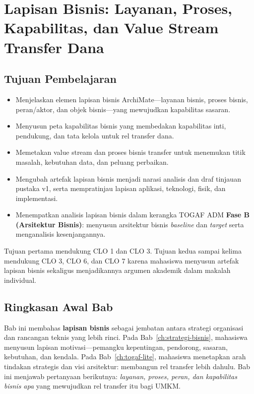 \chapter[Lapisan Bisnis: Layanan, Proses, dan Kapabilitas]{Lapisan Bisnis:
Layanan, Proses, Kapabilitas, dan Value Stream Transfer Dana}
\label{ch:business-architecture}
\setlength{\emergencystretch}{2em}

\section*{Tujuan Pembelajaran}
\begin{itemize}
  \item Menjelaskan elemen lapisan bisnis ArchiMate---layanan bisnis, proses
        bisnis, peran/aktor, dan objek bisnis---yang mewujudkan kapabilitas
        sasaran.
  \item Menyusun peta kapabilitas bisnis yang membedakan kapabilitas inti,
        pendukung, dan tata kelola untuk rel transfer dana.
  \item Memetakan value stream dan proses bisnis transfer untuk menemukan titik
        masalah, kebutuhan data, dan peluang perbaikan.
  \item Mengubah artefak lapisan bisnis menjadi narasi analisis dan draf
        tinjauan pustaka v1, serta mempratinjau lapisan aplikasi, teknologi,
        fisik, dan implementasi.
  \item Menempatkan analisis lapisan bisnis dalam kerangka TOGAF ADM
        \textbf{Fase B (Arsitektur Bisnis)}: menyusun arsitektur bisnis
        \emph{baseline} dan \emph{target} serta menganalisis kesenjangannya.
\end{itemize}

Tujuan pertama mendukung CLO 1 dan CLO 3. Tujuan kedua sampai kelima mendukung
CLO 3, CLO 6, dan CLO 7 karena mahasiswa menyusun artefak lapisan bisnis
sekaligus menjadikannya argumen akademik dalam makalah individual.

\section{Ringkasan Awal Bab}

Bab ini membahas \textbf{lapisan bisnis} sebagai jembatan antara strategi
organisasi dan rancangan teknis yang lebih rinci. Pada
Bab~\ref{ch:strategi-bisnis}, mahasiswa menyusun lapisan motivasi---pemangku
kepentingan, pendorong, sasaran, kebutuhan, dan kendala. Pada
Bab~\ref{ch:togaf-lite}, mahasiswa menetapkan arah tindakan strategis dan visi
arsitektur: membangun rel transfer lebih dahulu. Bab ini menjawab pertanyaan
berikutnya: \emph{layanan, proses, peran, dan kapabilitas bisnis apa} yang
mewujudkan rel transfer itu bagi UMKM.

